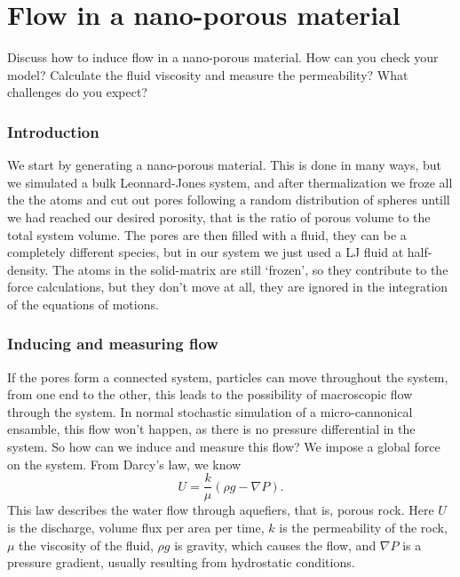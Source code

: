 \documentclass[a4paper, 11pt, notitlepage, english]{article}
\begin{document}
\clearpage


\section{Flow in a nano-porous material}
Discuss how to induce flow in a nano-porous material.  How can you check your model? Calculate the fluid viscosity and measure the permeability? What challenges do you expect? 

\subsubsection*{Introduction}

We start by generating a nano-porous material. This is done in many ways, but we simulated a bulk Leonnard-Jones system, and after thermalization we froze all the the atoms and cut out pores following a random distribution of spheres untill we had reached our desired porosity, that is the ratio of porous volume to the total system volume. The pores are then filled with a fluid, they can be a completely different species, but in our system we just used a LJ fluid at half-density. The atoms in the solid-matrix are still `frozen', so they contribute to the force calculations, but they don't move at all, they are ignored in the integration of the equations of motions.

\subsubsection*{Inducing and measuring flow}

If the pores form a connected system, particles can move throughout the system, from one end to the other, this leads to the possibility of macroscopic flow through the system. In normal stochastic simulation of a micro-cannonical ensamble, this flow won't happen, as there is no pressure differential in the system. So how can we induce and measure this flow? We impose a global force on the system. From Darcy's law, we know
$$U = \frac{k}{\mu}(\rho g - \nabla P).$$
This law describes the water flow through aquefiers, that is, porous rock. Here $U$ is the discharge, volume flux per area per time, $k$ is the permeability of the rock, $\mu$ the viscosity of the fluid, $\rho g$ is gravity, which causes the flow, and $\nabla P$ is a pressure gradient, usually resulting from hydrostatic conditions.
\end{document}
